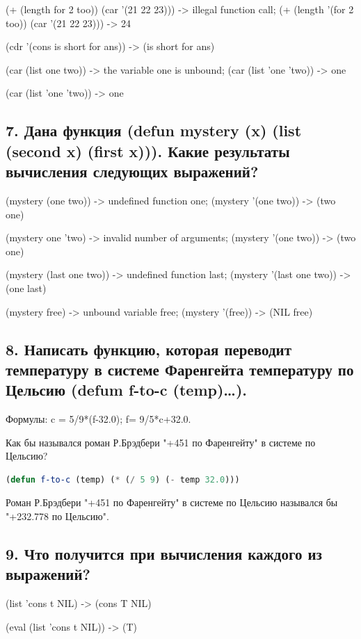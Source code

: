 \documentclass[12pt]{report}
\begin{document}
(+ (length for 2 too)) (car '(21 22 23))) -> illegal function call; (+ (length '(for 2 too)) (car '(21 22 23))) -> 24

(cdr '(cons is short for ans)) -> (is short for ans)

(car (list one two)) -> the variable one is unbound; (car (list 'one 'two)) -> one

(car (list 'one 'two)) -> one

\subsection*{7. Дана функция (defun mystery (x) (list (second x) (first x))). Какие результаты вычисления следующих выражений? }

(mystery (one two)) -> undefined function one; (mystery '(one two)) -> (two one)

(mystery one 'two) -> invalid number of arguments; (mystery '(one two)) -> (two one)

(mystery (last one two)) -> undefined function last; (mystery '(last one two)) -> (one last)

(mystery free) -> unbound variable free; (mystery '(free)) -> (NIL free)

\subsection*{8. Написать функцию, которая переводит температуру в системе Фаренгейта температуру по Цельсию (defum f-to-c (temp)…).}

Формулы: c = 5/9*(f-32.0); f= 9/5*c+32.0.

Как бы назывался роман Р.Брэдбери "+451 по Фаренгейту" в системе по Цельсию?

\begin{lstlisting}[label=5xd,caption=Решение задания №8, language=lisp]
	(defun f-to-c (temp) (* (/ 5 9) (- temp 32.0)))
\end{lstlisting}

Роман Р.Брэдбери "+451 по Фаренгейту" в системе по Цельсию назывался бы "+232.778 по Цельсию".

\subsection*{9. Что получится при вычисления каждого из выражений?}

(list 'cons t NIL) -> (cons T NIL)

(eval (list 'cons t NIL)) -> (T)
\end{document}
